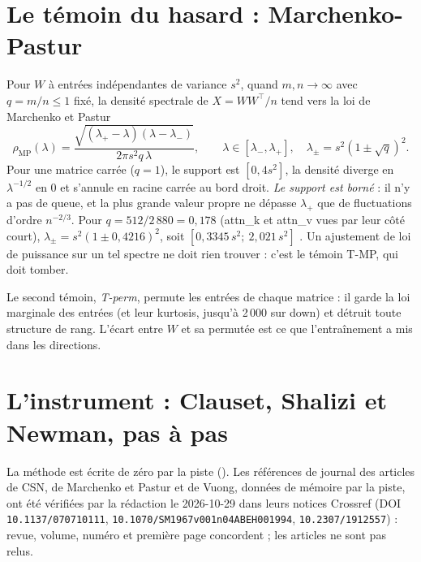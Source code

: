 \section{Le témoin du hasard : Marchenko-Pastur}\label{t3spe:sec:mp}

Pour $W$ à entrées indépendantes de variance $s^2$, quand $m, n \to \infty$ avec $q = m/n \le 1$ fixé, la densité spectrale de $X = WW^\top/n$ tend vers la loi de Marchenko et Pastur \cite{marchenko1967distribution}
\begin{equation}\label{t3spe:eq:mp}
\rho_{\mathrm{MP}}(\lambda) = \frac{\sqrt{(\lambda_+ - \lambda)(\lambda - \lambda_-)}}{2\pi s^2 q\,\lambda}, \qquad \lambda \in [\lambda_-, \lambda_+], \quad \lambda_\pm = s^2(1 \pm \sqrt q)^2 .
\end{equation}
Pour une matrice carrée ($q = 1$), le support est $[0, 4s^2]$, la densité diverge en $\lambda^{-1/2}$ en 0 et s'annule en racine carrée au bord droit. \emph{Le support est borné} : il n'y a pas de queue, et la plus grande valeur propre ne dépasse $\lambda_+$ que de fluctuations d'ordre $n^{-2/3}$. Pour $q = 512/2\,880 = 0{,}178$ (attn\_k et attn\_v vues par leur côté court), $\lambda_\pm = s^2(1 \pm 0{,}4216)^2$, soit $[0{,}3345\,s^2 ;\ 2{,}021\,s^2]$ \calc. Un ajustement de loi de puissance sur un tel spectre ne doit rien trouver : c'est le témoin T-MP, qui doit tomber.

Le second témoin, \emph{T-perm}, permute les entrées de chaque matrice : il garde la loi marginale des entrées (et leur kurtosis, jusqu'à 2\,000 sur down) et détruit toute structure de rang. L'écart entre $W$ et sa permutée est ce que l'entraînement a mis dans les directions.

\section{L'instrument : Clauset, Shalizi et Newman, pas à pas}\label{t3spe:sec:csn}

La méthode \cite{clauset2009power} est écrite de zéro par la piste (). Les références de journal des articles de CSN, de Marchenko et Pastur et de Vuong, données de mémoire par la piste, ont été vérifiées par la rédaction le 2026-10-29 dans leurs notices Crossref (DOI \texttt{10.1137/070710111}, \texttt{10.1070/SM1967v001n04ABEH001994}, \texttt{10.2307/1912557}) : revue, volume, numéro et première page concordent ; les articles ne sont pas relus.

